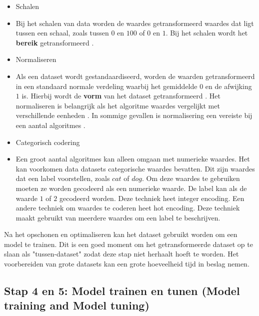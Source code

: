 \begin{itemize}
  \item Schalen
  \item[] Bij het schalen van data worden de waardes getransformeerd waardes dat ligt tussen een schaal, zoals tussen \(0\) en \(100\) of \(0\) en \(1\). Bij het schalen wordt het \textbf{bereik} getransformeerd \cite{scale-and-normalize-data}. 
  \item Normaliseren
  \item[] Als een dataset wordt gestandaardiseerd, worden de waarden getransformeerd in een standaard normale verdeling waarbij het gemiddelde \(0\) en de afwijking \(1\) is. Hierbij wordt de \textbf{vorm} van het dataset getransformeerd \cite{scale-and-normalize-data}. Het normaliseren is belangrijk als het algoritme waardes vergelijkt met verschillende eenheden \cite{feature-scaling-standardization}. In sommige gevallen is normalisering een vereiste bij een aantal algoritmes \cite{data-transformation-standardization-vs-normalization}.
  \item Categorisch codering
  \item[] Een groot aantal algoritmes kan alleen omgaan met numerieke waardes. Het kan voorkomen data datasets categorische waardes bevatten. Dit zijn waardes dat een label voorstellen, zoals \(cat\) of \(dog\). Om deze waardes te gebruiken moeten ze worden gecodeerd als een numerieke waarde. De label kan als de waarde \(1\) of \(2\) gecodeerd worden. Deze techniek heet integer encoding. Een andere techniek om waardes te coderen heet hot encoding. Deze techniek maakt gebruikt van meerdere waardes om een label te beschrijven.
\end{itemize}


Na het opschonen en optimaliseren kan het dataset gebruikt worden om een model te trainen. Dit is een goed moment om het getransformeerde dataset op te slaan als "tussen-dataset" zodat deze stap niet herhaalt hoeft te worden. Het voorbereiden van grote datasets kan een grote hoeveelheid tijd in beslag nemen.

\subsection{Stap 4 en 5: Model trainen en tunen (Model training and Model tuning)}\label{subsec:model-trainen-en-tunen}


